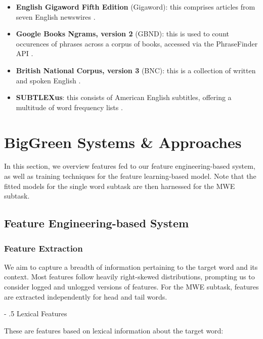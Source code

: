 \documentclass[11pt,a4paper]{article}
\makeatletter
\renewcommand\paragraph{%
    \@startsection{paragraph}{4}{0mm}%
        {-\baselineskip}%
        {.5\baselineskip}%
        {\normalfont\normalsize\bfseries}}
\makeatother
\begin{document}
\begin{itemize}
  \item \noindent \textbf{English Gigaword Fifth Edition} (Gigaword): this comprises articles from seven English newswires \citep{gigaword}.
  \item \noindent \textbf{Google Books Ngrams, version 2} (GBND): this is used to count occurences of phrases across a corpus of books, accessed via the PhraseFinder API \citep{phrasefinder}.
  \item \noindent \textbf{British National Corpus, version 3} (BNC): this is a collection of written and spoken English \citep{BNC}.
  \item \noindent \textbf{SUBTLEXus}: this consists of American English subtitles, offering a multitude of word frequency lists \citep{Brysbaert2009MovingBK}.
\end{itemize}

\section{BigGreen Systems \& Approaches}

In this section, we overview features fed to our feature engineering-based system, as well as training techniques for the feature learning-based model. Note that the fitted models for the single word subtask are then harnessed for the MWE subtask.

\subsection{Feature Engineering-based System}

\subsubsection{Feature Extraction}

We aim to capture a breadth of information pertaining to the target word and its context. Most features follow heavily right-skewed distributions, prompting us to consider logged and unlogged versions of features. For the MWE subtask, features are extracted independently for head and tail words.

\paragraph{Lexical Features}

These are features based on lexical information about the target word:
\end{document}
